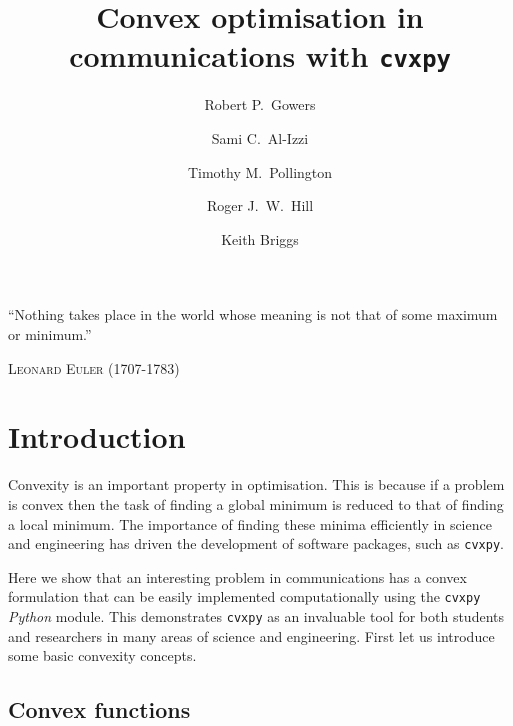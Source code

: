 \documentclass[twocolumn,secnumarabic,amssymb, nobibnotes, aps, prl,superscriptaddress]{revtex4-1}
\newcommand{\NewsItem}[1]{%
		\large #1 \vspace{4pt}
		\par \normalsize \normalfont}
\newcommand{\NewsAuthor}[1]{%
			\hfill \textsc{#1} \vspace{4pt}
			\par \normalfont}
\begin{document}

\title{Convex optimisation in communications with \texttt{cvxpy}}
\author{Robert P.~Gowers}%
\author{Sami C.~Al-Izzi}%
\author{Timothy M.~Pollington}%
\author{Roger J.~W.~Hill}%
\author{Keith Briggs}
\maketitle


	\NewsItem{\noindent``Nothing takes place in the world whose meaning is not that of some maximum or minimum.''}
	\NewsAuthor{Leonard Euler (1707-1783)}
    
\section{Introduction}
\noindent Convexity is an important property in optimisation. This is because if a problem is convex then the task of finding a global minimum is reduced to that of finding a local minimum. The importance of finding these minima efficiently in science and engineering has driven the development of software packages, such as \texttt{cvxpy}.

Here we show that an interesting problem in communications has a convex formulation that can be easily implemented computationally using the \texttt{cvxpy} \textit{Python} module. This demonstrates \texttt{cvxpy} as an invaluable tool for both students and researchers in many areas of science and engineering. First let us introduce some basic convexity concepts.

\subsection{Convex functions}
\end{document}
